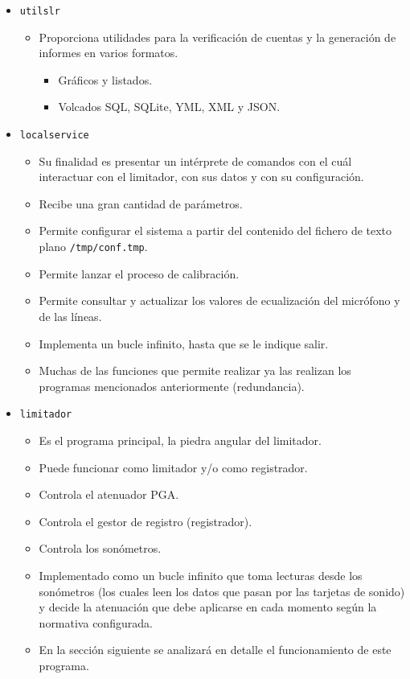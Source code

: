 \begin{itemize}
    \item \verb|utilslr|
    \begin{itemize}
        \item Proporciona utilidades para la verificación de cuentas y la generación de informes en varios formatos.
        \begin{itemize}
            \item Gráficos y listados.
            \item Volcados \acrshort{SQL}, SQLite, YML, \acrshort{XML} y \acrshort{JSON}.
        \end{itemize}
    \end{itemize}

    \item \verb|localservice|
    \begin{itemize}
        \item Su finalidad es presentar un intérprete de comandos con el cuál interactuar con el limitador, con sus datos y con su configuración.
        \item Recibe una gran cantidad de parámetros.
        \item Permite configurar el sistema a partir del contenido del fichero de texto plano \verb|/tmp/conf.tmp|.
        \item Permite lanzar el proceso de calibración.
        \item Permite consultar y actualizar los valores de ecualización del micrófono y de las líneas.
        \item Implementa un bucle infinito, hasta que se le indique salir.
        \item Muchas de las funciones que permite realizar ya las realizan los programas mencionados anteriormente (redundancia).
    \end{itemize}

    \item \verb|limitador|
    \begin{itemize}
        \item Es el programa principal, la piedra angular del limitador.
        \item Puede funcionar como limitador y/o como registrador.
        \item Controla el atenuador \acrshort{PGA}.
        \item Controla el gestor de registro (registrador).
        \item Controla los sonómetros.
        \item Implementado como un bucle infinito que toma lecturas desde los sonómetros (los cuales leen los datos que pasan por las tarjetas de sonido) y decide la atenuación que debe aplicarse en cada momento según la normativa configurada.
        \item En la sección siguiente se analizará en detalle el funcionamiento de este programa.
    \end{itemize}


\end{itemize}
